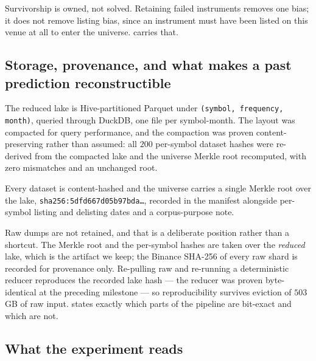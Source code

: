 Survivorship is owned, not solved. Retaining failed instruments removes one bias; it does not
remove listing bias, since an instrument must have been listed on this venue at all to enter the
universe.  carries that.

\subsection{Storage, provenance, and what makes a past prediction reconstructible}
\label{sec:data-provenance}

The reduced lake is Hive-partitioned Parquet under \texttt{(symbol, frequency, month)}, queried
through DuckDB, one file per symbol-month. The layout was compacted for query performance, and the
compaction was proven content-preserving rather than assumed: all $200$ per-symbol dataset hashes
were re-derived from the compacted lake and the universe Merkle root recomputed, with zero
mismatches and an unchanged root.

Every dataset is content-hashed and the universe carries a single Merkle root over the lake,
\texttt{sha256:\allowbreak 5dfd667d\allowbreak 05b97bda\ldots}, recorded in the manifest alongside per-symbol listing and
delisting dates and a corpus-purpose note.

Raw dumps are not retained, and that is a deliberate position rather than a shortcut. The Merkle
root and the per-symbol hashes are taken over the \emph{reduced} lake, which is the artifact we
keep; the Binance SHA-256 of every raw shard is recorded for provenance only. Re-pulling raw and
re-running a deterministic reducer reproduces the recorded lake hash --- the reducer was proven
byte-identical at the preceding milestone --- so reproducibility survives eviction of $503$\,GB of
raw input.
 states exactly which parts of the pipeline are bit-exact and which are not.

\subsection{What the experiment reads}
\label{sec:data-slice}

